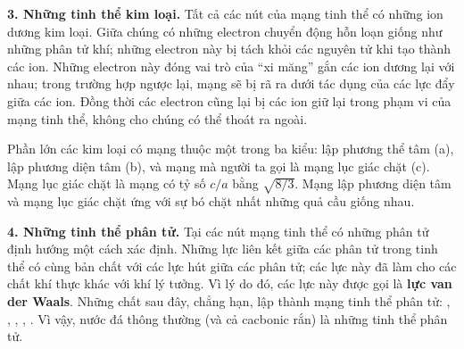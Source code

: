 
\textbf{3. Những tinh thể kim loại.} Tất cả các nút của mạng tinh thể có những ion dương kim loại. Giữa chúng có những electron chuyển động hỗn loạn giống như những phân tử khí; những electron này bị tách khỏi các nguyên tử khi tạo thành các ion. Những electron này đóng vai trò của ``xi măng'' gắn các ion dương lại với nhau; trong trường hợp ngược lại, mạng sẽ bị rã ra dưới tác dụng của các lực đẩy giữa các ion. Đồng thời các electron cũng lại bị các ion giữ lại trong phạm vi của mạng tinh thể, không cho chúng có thể thoát ra ngoài.


Phần lớn các kim loại có mạng thuộc một trong ba kiểu: lập phương thể tâm (a), lập phương diện tâm (b), và mạng mà người ta gọi là mạng lục giác chặt (c). Mạng lục giác chặt là mạng có tỷ số $c/a$ bằng $\sqrt{8/3}$. Mạng lập phương diện tâm và mạng lục giác chặt ứng với sự bó chặt nhất những quả cầu giống nhau.


\textbf{4. Những tinh thể phân tử.} Tại các nút mạng tinh thể có những phân tử định hướng một cách xác định. Những lực liên kết giữa các phân tử trong tinh thể có cùng bản chất với các lực hút giữa các phân tử; các lực này đã làm cho các chất khí thực khác với khí lý tưởng. Vì lý do đó, các lực này được gọi là \textbf{lực van der Waals}. Những chất sau đây, chẳng hạn, lập thành mạng tinh thể phân tử: , , , , . Vì vậy, nước đá thông thường (và cả cacbonic rắn) là những tinh thể phân tử.

